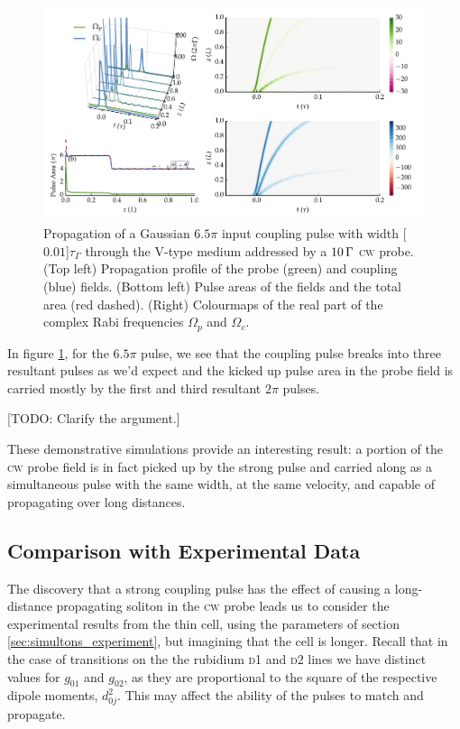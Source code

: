     \begin{figure}%
    \includegraphics[width=\linewidth]{figs/06_simultons/mb_vee_sit_plot_65pi_Ng1e4_fig1.pdf}
    \caption{
    Propagation of a Gaussian $6.5 \pi$ input coupling pulse with width
    \unit[$0.01$]{$\tau_\Gamma$} through the V-type medium addressed by a
    $\unit[10]{\Gamma}$ \textsc{cw} probe. (Top left) Propagation profile of the
    probe (green) and coupling (blue) fields. (Bottom left) Pulse areas of the
    fields and the total area (red dashed). (Right) Colourmaps of the real part
    of the complex Rabi frequencies $\Omega_{p}$ and $\Omega_{c}$.
    }
    \label{fig:pulse_cw_6pi_cmap}
    \end{figure}

    In figure \ref{fig:pulse_cw_6pi_cmap}, for the $6.5 \pi$ pulse, we see that
    the coupling pulse breaks into three resultant pulses as we'd expect and the
    kicked up pulse area in the probe field is carried mostly by the first and
    third resultant $2 \pi$ pulses.

    [TODO: Clarify the argument.]

    These demonstrative simulations provide an interesting result: a portion of
    the \textsc{cw} probe field is in fact picked up by the strong pulse and
    carried along as a simultaneous pulse with the same width, at the same
    velocity, and capable of propagating over long distances.

  \subsection{Comparison with Experimental Data}

    The discovery that a strong coupling pulse has the effect of causing a long-
    distance propagating soliton in the \textsc{cw} probe leads us to consider
    the experimental results from the thin cell, using the parameters of section
    \ref{sec:simultons_experiment}, but imagining that the cell is longer.
    Recall that in the case of transitions on the the rubidium \textsc{d1} and
    \textsc{d2} lines we have distinct values for $g_{01}$ and $g_{02}$, as they
    are proportional to the square of the respective dipole moments, $d_{0j}^2$.
    This may affect the ability of the pulses to match and propagate.

